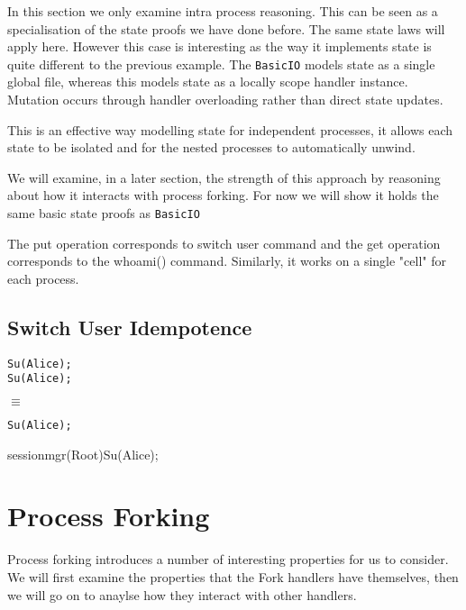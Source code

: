 \documentclass[logo,bsc,singlespacing,parskip]{infthesis}
\begin{document}
In this section we only examine intra process reasoning.
This can be seen as a specialisation of the state proofs we have done before. The same state laws will apply here.
However this case is interesting as the way it implements state is quite different to the previous example. The \texttt{BasicIO} models state as a single global file, whereas this models state as a locally scope handler instance. Mutation occurs through handler overloading rather than direct state updates.



This is an effective way modelling state for independent processes, it allows each state to be isolated and for the nested processes to automatically unwind.

We will examine, in a later section, the strength of this approach by reasoning about how it interacts with process forking. For now we will show it holds the same basic state proofs as \texttt{BasicIO} 


The put operation corresponds to switch user command and the get operation corresponds to the whoami() command. Similarly, it works on a single "cell" for each process. 


\subsection*{Switch User Idempotence}

\begin{lstlisting}
Su(Alice);
Su(Alice);
\end{lstlisting}
$\equiv$
\begin{lstlisting}
Su(Alice);
\end{lstlisting}

{}{sessionmgr(Root)}{Su(Alice);}

\section{Process Forking}
Process forking introduces a number of interesting properties for us to consider. We will first examine the properties that the Fork handlers have themselves, then we will go on to anaylse how they interact with other handlers. 
\end{document}
